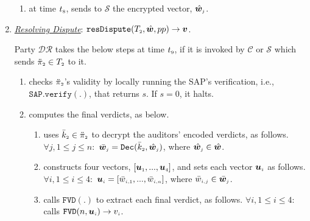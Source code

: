 \begin{enumerate}[leftmargin=.46cm]
\begin{enumerate}
\item at time $t_{\scriptscriptstyle 8}$, sends to $\mathcal S$ the encrypted vector, $\hat {\bm w}_{\scriptscriptstyle j}$. %
\end{enumerate}



\item\label{DR::DisputeResolution}  \underline{\textit{Resolving Dispute}}: $\mathtt{resDispute}(T_{\scriptscriptstyle 2}, \hat {\bm w}, pp)\rightarrow \bm v$.

 Party $\mathcal{DR}$ takes the below steps at time $t_{\scriptscriptstyle 9}$, if it is invoked by $\mathcal{C}$ or  $\mathcal{S}$ which sends $\ddot\pi_{\scriptscriptstyle 2}\in T_{\scriptscriptstyle 2}$ to it.

\begin{enumerate}
%
\item checks $\ddot{\pi}_{\scriptscriptstyle 2}$'s validity by locally running  the SAP's verification, i.e., $\mathtt{SAP.verify}(.)$, that  returns  $s$. If $s=0$, it halts. %
%
%
%

\item computes the final verdicts, as below. 
%
\begin{enumerate}
%
\item uses $\bar k_{\scriptscriptstyle 2}\in \ddot \pi_{\scriptscriptstyle 2}$ to decrypt the auditors' encoded verdicts, as follows. $ \forall j, 1\leq j \leq n:$
%
$ \bar {\bm w}_{\scriptscriptstyle j}= \mathtt{Dec}(\bar k_{\scriptscriptstyle 2}, \hat{\bm w}_{\scriptscriptstyle j})$, where $\hat{\bm w}_{\scriptscriptstyle j}\in \hat{\bm w}$.
 \item constructs four vectors, $[\bm u_{\scriptscriptstyle 1},...,\bm u_{\scriptscriptstyle 4}]$, and sets  each vector $\bm u_{\scriptscriptstyle i}$ as follows. $\forall i, 1\leq i \leq 4:$
  $\bm u_{\scriptscriptstyle i}=[\bar{w}_{\scriptscriptstyle i,1},...,\bar{w}_{\scriptscriptstyle i,n}]$, where $\bar{w}_{\scriptscriptstyle i,j}\in \bar {\bm w}_{\scriptscriptstyle j}$. 
%
\item calls $\mathtt{FVD}(.)$ to extract each final verdict, as follows. $\forall i, 1\leq i \leq 4:$ calls $\mathtt{FVD}(n,  {\bm u}_{\scriptscriptstyle i})\rightarrow  v_{\scriptscriptstyle i}$. 



\end{enumerate}
\end{enumerate}
\end{enumerate}
